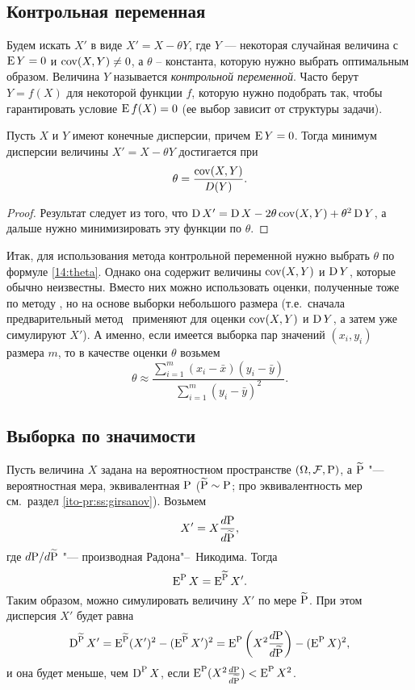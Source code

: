 \subsection{Контрольная переменная}

Будем искать $X'$ в виде $X' = X - \theta Y$, где $Y$ --- некоторая случайная величина с $\E Y = 0$ и $\cov(X,Y)\neq0$, а $\theta$ -- константа, которую нужно выбрать оптимальным образом.
Величина $Y$ называется \emph{контрольной переменной}.
Часто берут $Y= f(X)$ для некоторой функции $f$, которую нужно подобрать так, чтобы гарантировать условие $\E f(X) = 0$ (ее выбор зависит от структуры задачи).

\begin{proposition}
Пусть $X$ и $Y$ имеют конечные дисперсии, причем $\E Y = 0$.
Тогда минимум дисперсии величины $X' = X - \theta Y$ достигается при 
\begin{equation}
\label{14:theta}
\theta = \frac{\cov(X,Y)}{D(Y)}.
\end{equation}
\end{proposition}

\begin{proof}
Результат следует из того, что $\D X' = \D X - 2\theta \cov(X,Y) + \theta^2 \D Y$, а дальше нужно минимизировать эту функции по $\theta$.
\end{proof}

Итак, для использования метода контрольной переменной нужно выбрать $\theta$ по формуле \eqref{14:theta}.
Однако она содержит величины $\cov(X,Y)$ и $\D Y$, которые обычно неизвестны.
Вместо них можно использовать оценки, полученные тоже по методу \mc, но на основе выборки небольшого размера (т.е.\ сначала предварительный метод \mc\ применяют для оценки $\cov(X,Y)$ и $\D Y$, а затем уже  симулируют $X'$).
А именно, если имеется выборка пар значений $(x_i,y_i)$ размера $m$, то в качестве оценки $\theta$ возьмем
\[
\theta \approx \frac{\sum_{i=1}^m (x_i - \bar x)(y_i - \bar y)}{\sum_{i=1}^m (y_i - \bar y)^2}.
\]


\subsection{Выборка по значимости}
Пусть величина $X$ задана на вероятностном пространстве $(\Omega,\F,\P)$, а $\tilde\P$ "--- вероятностная мера, эквивалентная $\P$ ($\tilde\P\sim\P$; про эквивалентность мер см.~раздел \ref{ito-pr:ss:girsanov}).
Возьмем
\[
X' = X \frac{d\P}{d\tilde\P},
\]
где $d\P/d\tilde\P$ "--- производная Радона"--~Никодима.
Тогда
\[
\E^{\P} X = \E^{\tilde\P} X'.
\]
Таким образом, можно симулировать величину $X'$ по мере $\tilde\P$.
При этом дисперсия $X'$ будет равна
\[
\D^{\tilde \P} X' = \E^{\tilde\P} (X')^2 - (\E^{\tilde\P} X')^2 = \E^{\P} \left(X^2 \frac{d\P}{d\tilde\P}\right) -(\E^{\P} X)^2,
\]
и она будет меньше, чем $\D^\P X$, если $\E^\P(X^2 \frac{d\P}{d\tilde\P}) < \E^\P X^2$. 


